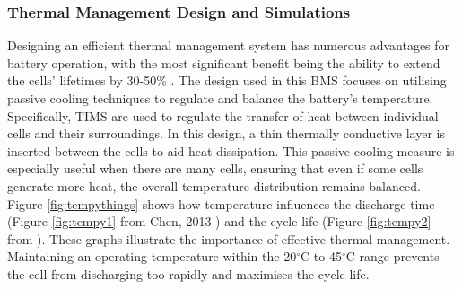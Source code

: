 \subsubsection{Thermal Management Design and Simulations}

Designing an efficient thermal management system has numerous advantages for battery operation, with the most significant benefit being the ability to extend the cells' lifetimes by 30-50\% \cite{TOGUN20251077}. The design used in this \gls{BMS} focuses on utilising passive cooling techniques to regulate and balance the battery's temperature. Specifically, \gls{TIMS} are used to regulate the transfer of heat between individual cells and their surroundings. In this design, a thin thermally conductive layer is inserted between the cells to aid heat dissipation. This passive cooling measure is especially useful when there are many cells, ensuring that even if some cells generate more heat, the overall temperature distribution remains balanced. Figure \ref{fig:tempythings} shows how temperature influences the discharge time (Figure \ref{fig:tempy1} from Chen, 2013 \cite{chen2013heat}) and the cycle life (Figure \ref{fig:tempy2} from \cite{REZVANIZANIANI2014110}). These graphs illustrate the importance of effective thermal management. Maintaining an operating temperature within the 20$^\circ\text{C}$ to 45$^\circ\text{C}$ range prevents the cell from discharging too rapidly and maximises the cycle life.

